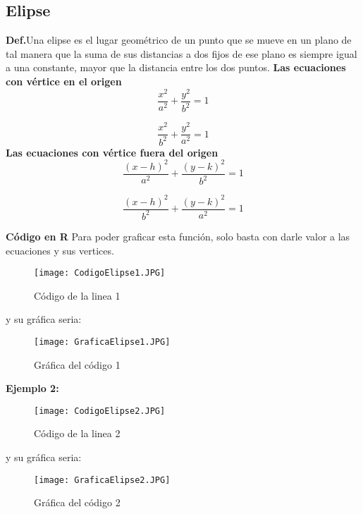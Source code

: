 \documentclass{article}
\begin{document}
\subsection{Elipse}
\textbf{Def.}Una elipse es el lugar geométrico de un punto que se mueve en un plano de tal manera que la suma de sus distancias a dos fijos de ese plano es siempre igual a una constante, mayor que la distancia entre los dos puntos.
\newline
\textbf{Las ecuaciones con vértice en el origen}
\begin{equation}
\frac{x^2}{a^2} + \frac{y^2}{b^2} = 1
\end{equation}

\begin{equation}
\frac{x^2}{b^2} + \frac{y^2}{a^2} = 1
\end{equation}
\newline
\textbf{Las ecuaciones con vértice fuera del origen}
\begin{equation}
\frac{(x-h)^2}{a^2} + \frac{(y-k)^2}{b^2} = 1
\end{equation}

\begin{equation}
\frac{(x-h)^2}{b^2} + \frac{(y-k)^2}{a^2} = 1
\end{equation}

\textbf{Código en R}
\newline Para poder graficar esta función, solo basta con darle valor a las ecuaciones y sus vertices.
\newpage

\begin{figure}
\raggedright
\texttt{[image: CodigoElipse1.JPG]}
\caption{Código de la linea 1}
\label{fig:mesh13}
\end{figure}
y su gráfica seria:
\begin{figure}[h]
\centering
\texttt{[image: GraficaElipse1.JPG]}
\caption{Gráfica del código 1}
\label{fig:mesh14}
\end{figure}

\textbf{Ejemplo 2:}
\newpage

\begin{figure}
\raggedright
\texttt{[image: CodigoElipse2.JPG]}
\caption{Código de la linea 2}
\label{fig:mesh15}
\end{figure}
y su gráfica seria:
\begin{figure}[h]
\centering
\texttt{[image: GraficaElipse2.JPG]}
\caption{Gráfica del código 2}
\label{fig:mesh16}
\end{figure}
\end{document}
